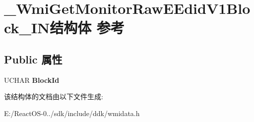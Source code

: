 \hypertarget{struct___wmi_get_monitor_raw_e_edid_v1_block___i_n}{}\section{\+\_\+\+Wmi\+Get\+Monitor\+Raw\+E\+Edid\+V1\+Block\+\_\+\+I\+N结构体 参考}
\label{struct___wmi_get_monitor_raw_e_edid_v1_block___i_n}
\subsection*{Public 属性}
\begin{DoxyCompactItemize}
\item 
\mbox{\label{struct___wmi_get_monitor_raw_e_edid_v1_block___i_n_a0487091b36563255d443ccdf0a7ec07a}} 
U\+C\+H\+AR {\bfseries Block\+Id}
\end{DoxyCompactItemize}


该结构体的文档由以下文件生成\+:\begin{DoxyCompactItemize}
\item 
E\+:/\+React\+O\+S-\/0../sdk/include/ddk/wmidata.\+h\end{DoxyCompactItemize}
